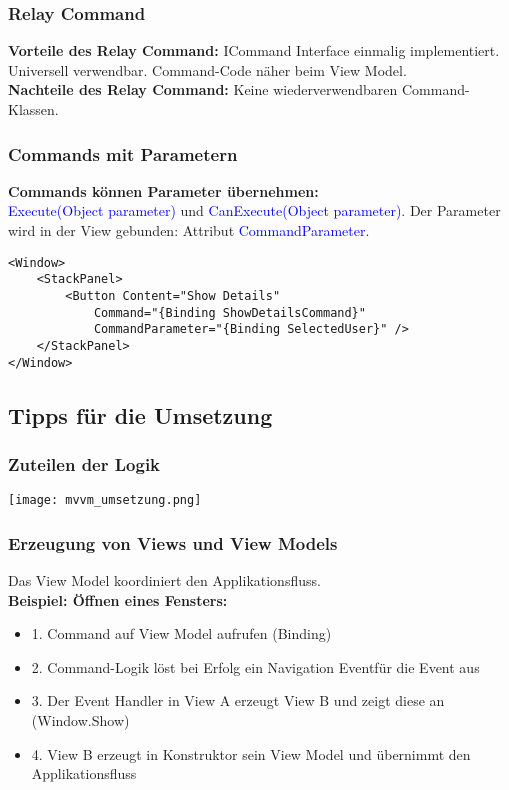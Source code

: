 \subsubsection{Relay Command}
\textbf{Vorteile des Relay Command:} ICommand Interface einmalig implementiert. Universell verwendbar. Command-Code näher beim View Model.\\
\textbf{Nachteile des Relay Command:} Keine wiederverwendbaren Command-Klassen.
\subsubsection{Commands mit Parametern}
\textbf{Commands können Parameter übernehmen:}\\
\textcolor{blue}{Execute(Object parameter)} und \textcolor{blue}{CanExecute(Object parameter)}. Der Parameter wird in der View gebunden: Attribut \textcolor{blue}{CommandParameter}.
\begin{lstlisting}
<Window>
    <StackPanel>
        <Button Content="Show Details"
            Command="{Binding ShowDetailsCommand}"
            CommandParameter="{Binding SelectedUser}" />
    </StackPanel>
</Window>
\end{lstlisting}

\subsection{Tipps für die Umsetzung}
\subsubsection{Zuteilen der Logik}
\texttt{[image: mvvm\_umsetzung.png]}
\subsubsection{Erzeugung von Views und View Models}
Das View Model koordiniert den Applikationsfluss.\\
\textbf{Beispiel: Öffnen eines Fensters:}
\begin{itemize}[topsep=0pt, leftmargin=4mm]
    \setlength\itemsep{-0.3em}
    \item 1. Command auf View Model aufrufen (Binding)
    \item 2. Command-Logik löst bei Erfolg ein \dq Navigation Event\dq für die Event aus
    \item 3. Der Event Handler in View A erzeugt View B und zeigt diese an (Window.Show)
    \item 4. View B erzeugt in Konstruktor sein View Model und übernimmt den Applikationsfluss
\end{itemize}
